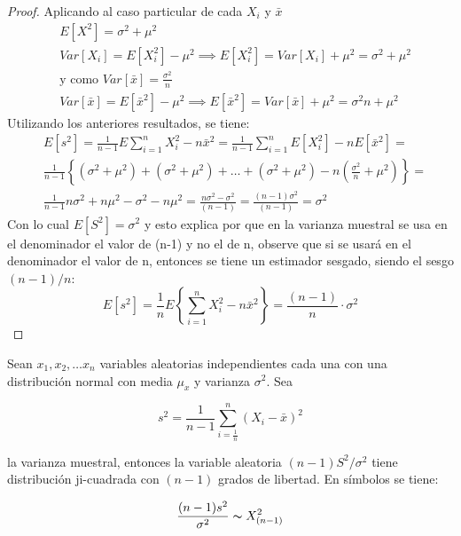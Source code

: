 \begin{proof}
    Aplicando al caso particular de cada $X_i$ y $\bar{x}$
\begin{align*}
         & E[X^2]=\sigma^2+\mu^2                                                                          \\
         & Var[X_i]=E[X_i^2]-\mu^2\implies  E[X_i^2]=Var [X_i] +\mu^2=\sigma^2 +\mu^2                     \\
         & \text{y como } Var[ \bar{x} ] =\frac{\sigma^2}{n}                                              \\
         & Var[ \bar{x} ]=E [ \bar{x}^2]-\mu^2\implies  E[\bar{x}^2]=Var[ \bar{x} ]+\mu^2=\sigma^2n+\mu^2
    \end{align*}
    Utilizando los anteriores resultados, se tiene:
    \begin{align*}
         & E[ s^2]=\frac{1}{n-1}E{\sum_{i=1}^nX_i^2-n \bar{x}^2}=\frac{1}{n-1} {\sum_{i=1}^nE[X_i^2]-nE[ \bar{x}^2]}=                                                               \\
         & \frac{1}{n-1} \left\{\left( \sigma^2+\mu^2 \right)+\left( \sigma^2+\mu^2 \right)+\dots +\left( \sigma^2+\mu^2 \right)-n\left( \frac{\sigma^2}{n}+\mu^2 \right)\right\} = \\
         & \frac{1}{n-1}{n\sigma^2+n\mu^2-\sigma^2-n\mu^2}=\frac{n\sigma^2-\sigma^2}{(n-1)}=\frac{(n-1) \sigma^2}{(n-1)}=\sigma^2
    \end{align*}
    Con lo cual $E[S^2] = \sigma^2$ y esto explica por que en la varianza muestral se usa en el
    denominador el valor de (n-1) y no el de n, observe que si se usará en el
    denominador el valor de n, entonces se tiene un estimador sesgado, siendo el sesgo
    $(n-1)/n$:
    \begin{equation}
        E[s^2]=\frac{1}{n}E\left\{\sum_{i=1}^n X_i^2-n\bar{x}^2\right\} =\frac{(n-1)}{n}\cdot\sigma^2
    \end{equation}
\end{proof}

\begin{theorem}
    Sean $x_1,x_2,\dots x_n$ variables aleatorias independientes cada una
    con una distribución normal con media $\mu_x$
    y varianza $\sigma^2$. Sea

    \begin{equation*}
        s^2=\frac{1}{n-1} \sum_{i=\frac{1}{n}}^n(X_i-\bar{x} )^2
    \end{equation*}

    la varianza muestral, entonces la variable aleatoria
    $(n-1)S^2/\sigma^2$ tiene distribución ji-cuadrada con $(n-1)$ grados de
    libertad. En símbolos se tiene:

    \begin{equation}
        \frac{(n-1 ) s^2}{\sigma^2} \thicksim X^2_{( n-1)}
    \end{equation}
\end{theorem}

